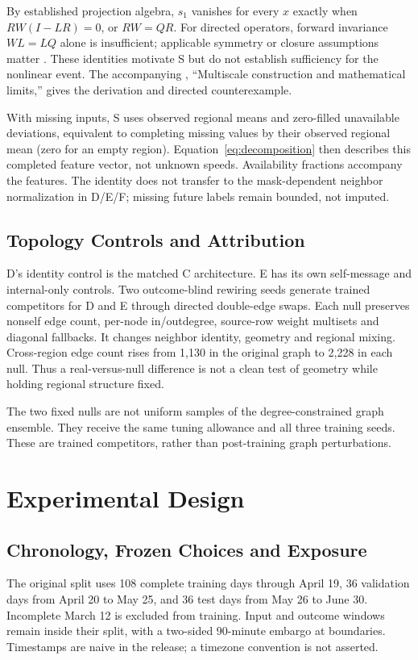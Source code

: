 \documentclass{llncs}
\begin{document}
By established projection algebra, $s_1$ vanishes for every $x$ exactly when $RW(I-LR)=0$, or $RW=QR$. For directed operators, forward invariance $WL=LQ$ alone is insufficient; applicable symmetry or closure assumptions matter \cite{schaub}. These identities motivate S but do not establish sufficiency for the nonlinear event. The accompanying , ``Multiscale construction and mathematical limits,'' gives the derivation and directed counterexample.

With missing inputs, S uses observed regional means and zero-filled unavailable deviations, equivalent to completing missing values by their observed regional mean (zero for an empty region). Equation~\ref{eq:decomposition} then describes this completed feature vector, not unknown speeds. Availability fractions accompany the features. The identity does not transfer to the mask-dependent neighbor normalization in D/E/F; missing future labels remain bounded, not imputed.

\subsection{Topology Controls and Attribution}
D's identity control is the matched C architecture. E has its own self-message and internal-only controls. Two outcome-blind rewiring seeds generate trained competitors for D and E through directed double-edge swaps. Each null preserves nonself edge count, per-node in/outdegree, source-row weight multisets and diagonal fallbacks. It changes neighbor identity, geometry and regional mixing. Cross-region edge count rises from 1,130 in the original graph to 2,228 in each null. Thus a real-versus-null difference is not a clean test of geometry while holding regional structure fixed.

The two fixed nulls are not uniform samples of the degree-constrained graph ensemble. They receive the same tuning allowance and all three training seeds. These are trained competitors, rather than post-training graph perturbations.

\section{Experimental Design}
\subsection{Chronology, Frozen Choices and Exposure}
The original split uses 108 complete training days through April 19, 36 validation days from April 20 to May 25, and 36 test days from May 26 to June 30. Incomplete March 12 is excluded from training. Input and outcome windows remain inside their split, with a two-sided 90-minute embargo at boundaries. Timestamps are naive in the release; a timezone convention is not asserted.
\end{document}
